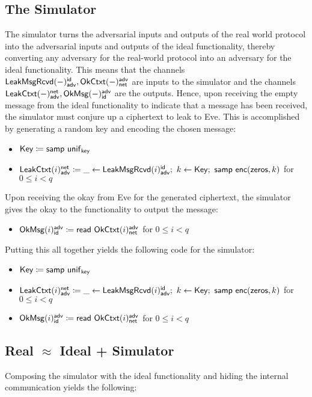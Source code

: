 \subsection{The Simulator}
The simulator turns the adversarial inputs and outputs of the real world protocol into the adversarial inputs and outputs of the ideal functionality, thereby converting any adversary for the real-world protocol into an adversary for the ideal functionality. This means that the channels $\mathsf{LeakMsgRcvd}(-)^{\mathsf{id}}_{\mathsf{adv}}, \mathsf{OkCtxt}(-)^{\mathsf{adv}}_{\mathsf{net}}$ are inputs to the simulator and the channels $\mathsf{LeakCtxt}(-)^{\mathsf{net}}_{\mathsf{adv}}, \mathsf{OkMsg}(-)^{\mathsf{adv}}_{\mathsf{id}}$ are the outputs. Hence, upon receiving the empty message from the ideal functionality to indicate that a message has been received, the simulator must conjure up a ciphertext to leak to Eve. This is accomplished by generating a random key and encoding the chosen message:
\begin{itemize}
\item $\mathsf{Key} \coloneqq \mathsf{samp} \ \mathsf{unif}_{\mathsf{key}}$
\item $\LeakCtxt(i)^\net_\adv \coloneqq \_ \leftarrow \LeakMsgRcvd(i)^\id_\adv; \ k \leftarrow \Key; \ \samp{\enc(\zeros,k)}$ for $0 \leq i < q$
\end{itemize}
Upon receiving the okay from Eve for the generated ciphertext, the simulator gives the okay to the functionality to output the message:
\begin{itemize}
\item $\mathsf{OkMsg}(i)^{\mathsf{adv}}_{\mathsf{id}} \coloneqq \mathsf{read} \ \mathsf{OkCtxt}(i)^{\mathsf{adv}}_{\mathsf{net}}$ for $0 \leq i < q$
\end{itemize}
Putting this all together yields the following code for the simulator:
\begin{itemize}
\item $\mathsf{Key} \coloneqq \mathsf{samp} \ \mathsf{unif}_{\mathsf{key}}$
\item $\LeakCtxt(i)^\net_\adv \coloneqq \_ \leftarrow \LeakMsgRcvd(i)^\id_\adv; \ k \leftarrow \Key; \ \samp{\enc(\zeros,k)}$ for $0 \leq i < q$
\item $\mathsf{OkMsg}(i)^{\mathsf{adv}}_{\mathsf{id}} \coloneqq \mathsf{read} \ \mathsf{OkCtxt}(i)^{\mathsf{adv}}_{\mathsf{net}}$ for $0 \leq i < q$
\end{itemize}

\subsection{Real $\approx$ Ideal + Simulator}
Composing the simulator with the ideal functionality and hiding the internal communication yields the following:

